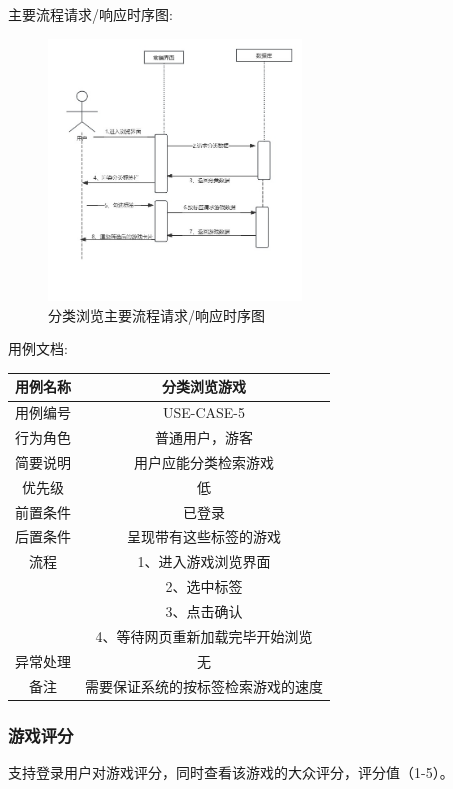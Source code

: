 \documentclass[12pt]{ctexart} %
\begin{document}
主要流程请求/响应时序图:
\begin{figure}[h]
  \centering
  \includegraphics[width=0.6\textwidth]{yongli5.jpg}
  \caption{分类浏览主要流程请求/响应时序图}
\end{figure}
用例文档:

\begin{tabular}{|c|c|}
  \hline
  用例名称& 分类浏览游戏\\
  \hline
  用例编号 & USE-CASE-5\\
  \hline
  行为角色 & 普通用户，游客\\
  \hline
  简要说明 & 用户应能分类检索游戏\\
  \hline
  优先级 & 低\\
  \hline
  前置条件 & 已登录\\
  \hline
  后置条件 & 呈现带有这些标签的游戏\\
  \hline
  流程 & 1、进入游戏浏览界面\\
       & 2、选中标签\\
       & 3、点击确认\\
       & 4、等待网页重新加载完毕开始浏览\\
  \hline
  异常处理 & 无\\
  \hline
  备注 & 需要保证系统的按标签检索游戏的速度\\
  \hline
\end{tabular}

\subsubsection{游戏评分}
支持登录用户对游戏评分，同时查看该游戏的大众评分，评分值（1-5）。
\end{document}
